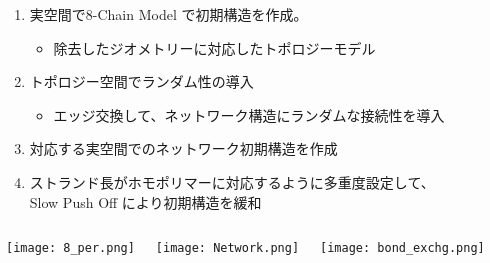 \begin{enumerate}
    \item \alert{実空間}で8-Chain Model で初期構造を作成。
        \begin{itemize}
            \item 除去したジオメトリーに対応した\alert{トポロジーモデル}
        \end{itemize}
    \item トポロジー空間でランダム性の導入
        \begin{itemize}
            \item \alert{エッジ交換}して、ネットワーク構造にランダムな接続性を導入
        \end{itemize}	
    \item 対応する\alert{実空間でのネットワーク初期構造}を作成
    \item \alert{ストランド長がホモポリマーに対応}するように多重度設定して、\\ \alert{Slow Push Off により初期構造を緩和}
\end{enumerate}

\vspace{-1mm}
\begin{columns}[T, onlytextwidth]
        \texttt{[image: 8\_per.png]}
        \vspace{-5mm}
        \begin{center}
            \texttt{[image: Network.png]}
        \end{center}
        \texttt{[image: bond\_exchg.png]}
\end{columns}